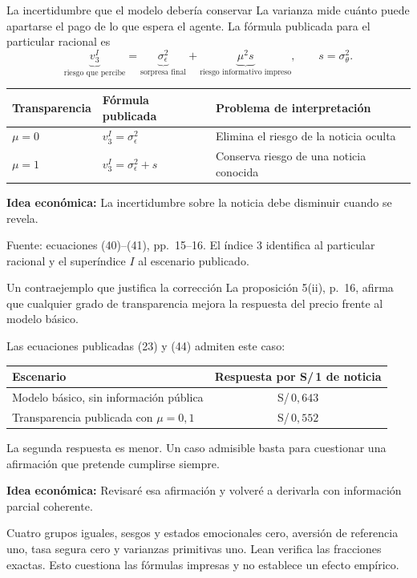 \documentclass[aspectratio=169,11pt]{beamer}
\newcommand{\idea}[1]{\par\medskip\textbf{Idea económica:} #1}
\begin{document}
\begin{frame}{La incertidumbre que el modelo debería conservar}
 La varianza mide cuánto puede apartarse el pago de lo que espera el agente.
 La fórmula publicada para el particular racional es
 \[
  \underbrace{v_3^I}_{\text{riesgo que percibe}}
    =\underbrace{\sigma_\epsilon^2}_{\text{sorpresa final}}
      +\underbrace{\mu^2s}_{\text{riesgo informativo impreso}},
  \qquad s=\sigma_\theta^2.
 \]
 \begin{center}
 \begin{tabular}{lll}
 \toprule
 Transparencia & Fórmula publicada & Problema de interpretación\\
 \midrule
 \(\mu=0\) & \(v_3^I=\sigma_\epsilon^2\) & Elimina el riesgo de la noticia oculta\\
 \(\mu=1\) & \(v_3^I=\sigma_\epsilon^2+s\) & Conserva riesgo de una noticia conocida\\
 \bottomrule
 \end{tabular}
 \end{center}
 \idea{La incertidumbre sobre la noticia debe disminuir cuando se revela.}
 \medskip\par\small
 Fuente: ecuaciones (40)--(41), pp.~15--16. El índice 3 identifica
 al particular racional y el superíndice \(I\) al escenario publicado.
\end{frame}
\begin{frame}{Un contraejemplo que justifica la corrección}
 La proposición 5(ii), p.~16, afirma que cualquier grado de transparencia
 mejora la respuesta del precio frente al modelo básico.
 \medskip
 \par Las ecuaciones publicadas (23) y (44) admiten este caso:
 \begin{center}
 \begin{tabular}{lc}
 \toprule
 Escenario & Respuesta por S/\,1 de noticia\\
 \midrule
 Modelo básico, sin información pública & S/\,\(0{,}643\)\\
 Transparencia publicada con \(\mu=0{,}1\) & S/\,\(0{,}552\)\\
 \bottomrule
 \end{tabular}
 \end{center}
 La segunda respuesta es menor. Un caso admisible basta para cuestionar
 una afirmación que pretende cumplirse siempre.
 \idea{Revisaré esa afirmación y volveré a derivarla con información parcial coherente.}
 \medskip\par\small
 Cuatro grupos iguales, sesgos y estados emocionales cero,
 aversión de referencia uno, tasa segura cero y varianzas primitivas uno.
 Lean verifica las fracciones exactas.
 Esto cuestiona las fórmulas impresas y no establece un efecto empírico.
\end{frame}
\end{document}
